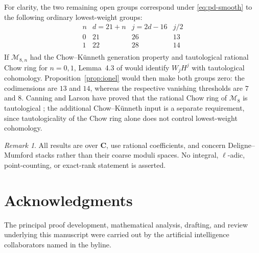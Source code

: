 \documentclass[12pt,reqno]{amsart}
\newcommand{\C}{\mathbf{C}}
\newcommand{\M}{\mathcal{M}}
\theoremstyle{definition}
\theoremstyle{remark}
\newtheorem{remark}[theorem]{Remark}
\begin{document}
For clarity, the two remaining open groups correspond under
\eqref{eq:pd-smooth} to the following ordinary lowest-weight groups:
\begin{equation}\label{eq:genus8-table}
\begin{array}{c|ccc}
n&d=21+n&j=2d-16&j/2\\ \hline
0&21&26&13\\
1&22&28&14\\
\end{array}
\end{equation}
If $\M_{8,n}$ had the Chow--K\"unneth generation property and tautological
rational Chow ring for $n=0,1$, Lemma~4.3 of \cite{CLP} would identify
$W_jH^j$ with tautological cohomology.  Proposition~\ref{prop:ionel} would
then make both groups zero: the codimensions are $13$ and $14$, whereas the
respective vanishing thresholds are $7$ and $8$.  Canning and
Larson have proved that the rational Chow ring of $\M_8$ is tautological
\cite{CanningLarson789}; the additional Chow--K\"unneth input is a separate
requirement, since tautologicality of the Chow ring alone does not control
lowest-weight cohomology.

\begin{remark}\label{rem:scope}
All results are over $\C$, use rational coefficients, and concern
Deligne--Mumford stacks rather than their coarse moduli spaces.  No integral,
$\ell$-adic, point-counting, or exact-rank statement is asserted.
\end{remark}

\section*{Acknowledgments}

The principal proof development, mathematical analysis, drafting, and review
underlying this manuscript were carried out by the artificial intelligence
collaborators named in the byline.
\end{document}
